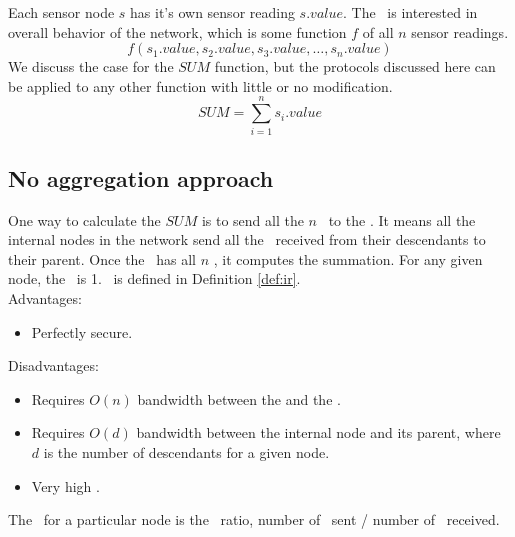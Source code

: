 	Each sensor node $s$ has it's own sensor reading $s.value$. The \bs\ is interested in overall behavior of the network, which is some function $f$ of all $n$ sensor readings.
	\begin{equation}
		f(s_{1}.value, s_{2}.value, s_{3}.value, \dotsc, s_{n}.value)
	\end{equation}
	We discuss the case for the $SUM$ function, but the protocols discussed here can be applied to any other function with little or no modification. 
	\begin{equation}
		SUM = \sum\limits_{i=1}^n s_{i}.value
	\end{equation}

	\subsection{No aggregation approach}
		One way to calculate the $SUM$ is to send all the $n$ \payloads\ to the \bs.
		It means all the internal nodes in the network send all the \payloads\ received from their descendants to their parent.
		Once the \bs\ has all $n$ \payloads, it computes the summation.
		For any given node, the \inforate\ is 1. \inforate\ is defined in Definition \ref{def:ir}.\\
		Advantages:
		\begin{itemize}
			\item Perfectly secure.
		\end{itemize}
		Disadvantages:
		\begin{itemize}
			\item Requires $O(n)$ bandwidth between the \bs and the \bs.
			\item Requires $O(d)$ bandwidth between the internal node and its parent, where $d$ is the number of descendants for a given node.
			\item Very high \inforate.
		\end{itemize}
			
	\begin{definition}\label{def:ir}
		The \inforate\ for a particular node is the \payloads\ ratio, number of \payloads\ sent / number of \payloads\ received.
	\end{definition}

